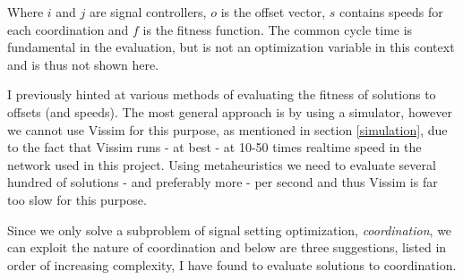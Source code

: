 Where $i$ and $j$ are signal controllers, $o$ is the offset vector, $s$ contains speeds for each coordination and $f$ is the fitness function. The common cycle time is fundamental in the evaluation, but is not an optimization variable in this context and is thus not shown here.

I previously hinted at various methods of evaluating the fitness of solutions to offsets (and speeds). The most general approach is by using a simulator, however we cannot use Vissim for this purpose, as mentioned in section \ref{simulation}, due to the fact that Vissim runs - at best - at 10-50 times realtime speed in the network used in this project. Using metaheuristics we need to evaluate several hundred of solutions - and preferably more - per second and thus Vissim is far too slow for this purpose.

Since we only solve a subproblem of signal setting optimization, \textit{coordination}, we can exploit the nature of coordination and below are three suggestions, listed in order of increasing complexity, I have found to evaluate solutions to coordination.

